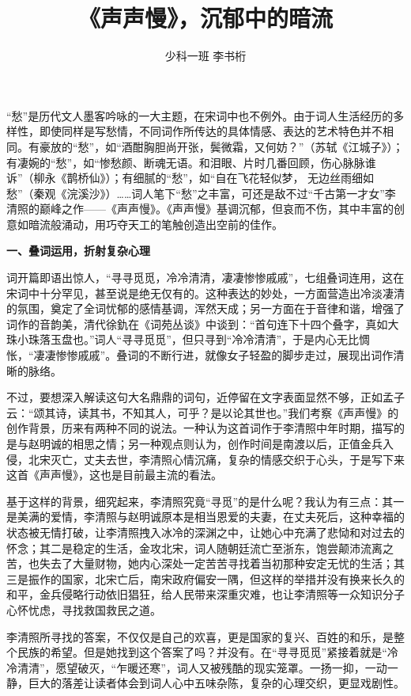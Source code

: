 \documentclass[UTF8, zihao=5, a4paper, oneside]{ctexart}
\title{《声声慢》，沉郁中的暗流}
\author{{\kaishu 少科一班 \enspace 李书桁}}
\date{}
\newcommand{\makenewtitle}[1]{\setlength{\parskip}{0.5em}\textbf{#1}\setlength{\parskip}{0em}}
\begin{document}
    \maketitle

    “愁”是历代文人墨客吟咏的一大主题，在宋词中也不例外。由于词人生活经历的多样性，即使同样是写愁情，不同词作所传达的具体情感、表达的艺术特色并不相同。有豪放的“愁”，如“酒酣胸胆尚开张，鬓微霜，又何妨？”（苏轼《江城子》）；有凄婉的“愁”，如“惨愁颜、断魂无语。和泪眼、片时几番回顾，伤心脉脉谁诉”（柳永《鹊桥仙》）；有细腻的“愁”，如“自在飞花轻似梦， 无边丝雨细如愁”（秦观《浣溪沙》）……词人笔下“愁”之丰富，可还是敌不过“千古第一才女”李清照的巅峰之作——《声声慢》。《声声慢》基调沉郁，但哀而不伤，其中丰富的创意如暗流般涌动，用巧夺天工的笔触创造出空前的佳作。

    \makenewtitle{一、叠词运用，折射复杂心理}

    词开篇即语出惊人，“寻寻觅觅，冷冷清清，凄凄惨惨戚戚”，七组叠词连用，这在宋词中十分罕见，甚至说是绝无仅有的。这种表达的妙处，一方面营造出冷淡凄清的氛围，奠定了全词忧郁的感情基调，浑然天成；另一方面在于音律和谐，增强了词作的音韵美，清代徐釚在《词苑丛谈》中谈到：“首句连下十四个叠字，真如大珠小珠落玉盘也。”词人“寻寻觅觅”，但只寻到“冷冷清清”，于是内心无比惆怅，“凄凄惨惨戚戚”。叠词的不断行进，就像女子轻盈的脚步走过，展现出词作清晰的脉络。

    不过，要想深入解读这句大名鼎鼎的词句，近停留在文字表面显然不够，正如孟子云：“颂其诗，读其书，不知其人，可乎？是以论其世也。”我们考察《声声慢》的创作背景，历来有两种不同的说法。一种认为这首词作于李清照中年时期，描写的是与赵明诚的相思之情；另一种观点则认为，创作时间是南渡以后，正值金兵入侵，北宋灭亡，丈夫去世，李清照心情沉痛，复杂的情感交织于心头，于是写下来这首《声声慢》，这也是目前最主流的看法。

    基于这样的背景，细究起来，李清照究竟“寻觅”的是什么呢？我认为有三点：其一是美满的爱情，李清照与赵明诚原本是相当恩爱的夫妻，在丈夫死后，这种幸福的状态被无情打破，让李清照拽入冰冷的深渊之中，让她心中充满了悲恸和对过去的怀念；其二是稳定的生活，金攻北宋，词人随朝廷流亡至浙东，饱尝颠沛流离之苦，也失去了大量财物，她内心深处一定苦苦寻找着当初那种安定无忧的生活；其三是振作的国家，北宋亡后，南宋政府偏安一隅，但这样的举措并没有换来长久的和平，金兵侵略行动依旧猖狂，给人民带来深重灾难，也让李清照等一众知识分子心怀忧虑，寻找救国救民之道。

    李清照所寻找的答案，不仅仅是自己的欢喜，更是国家的复兴、百姓的和乐，是整个民族的希望。但是她找到这个答案了吗？并没有。在“寻寻觅觅”紧接着就是“冷冷清清”，愿望破灭，“乍暖还寒”，词人又被残酷的现实笼罩。一扬一抑，一动一静，巨大的落差让读者体会到词人心中五味杂陈，复杂的心理交织，更显戏剧性。
\end{document}

